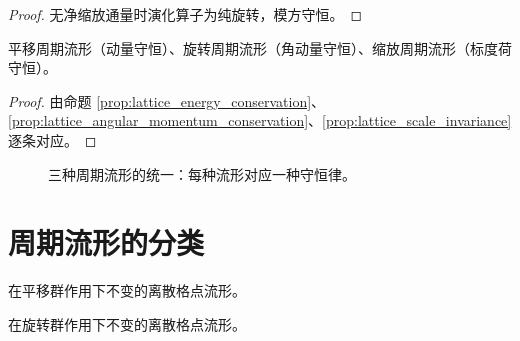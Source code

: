 \begin{proof}
无净缩放通量时演化算子为纯旋转，模方守恒。
\end{proof}

\begin{theorem}[守恒律在三种周期流形上的统一]\label{thm:conservation_periodic_manifolds}
平移周期流形（动量守恒）、旋转周期流形（角动量守恒）、缩放周期流形（标度荷守恒）。
\end{theorem}

\begin{proof}
由命题 \ref{prop:lattice_energy_conservation}、\ref{prop:lattice_angular_momentum_conservation}、\ref{prop:lattice_scale_invariance} 逐条对应。
\end{proof}

\begin{figure}[htbp]
\centering
{}
\caption{三种周期流形的统一：每种流形对应一种守恒律。}
\label{fig:three_periodic_manifolds}
\end{figure}

\section{周期流形的分类}\label{sec:periodic_manifold_classification}

\begin{definition}[平移周期流形]\label{def:translation_periodic_manifold}
在平移群作用下不变的离散格点流形。
\end{definition}

\begin{definition}[旋转周期流形]\label{def:rotation_periodic_manifold}
在旋转群作用下不变的离散格点流形。
\end{definition}

